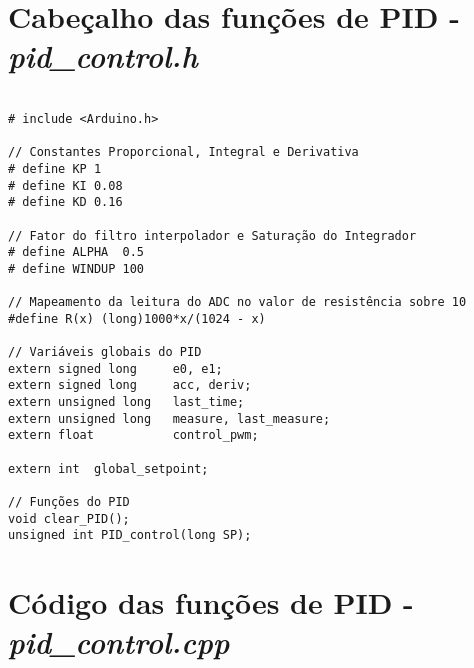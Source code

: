 \section{Cabeçalho das funções de PID - \textit{pid\_control.h}}

\begin{lstlisting}

# include <Arduino.h>

// Constantes Proporcional, Integral e Derivativa
# define KP 1
# define KI 0.08
# define KD 0.16

// Fator do filtro interpolador e Saturação do Integrador
# define ALPHA  0.5
# define WINDUP 100 

// Mapeamento da leitura do ADC no valor de resistência sobre 10
#define R(x) (long)1000*x/(1024 - x)

// Variáveis globais do PID
extern signed long     e0, e1;
extern signed long     acc, deriv;
extern unsigned long   last_time;
extern unsigned long   measure, last_measure;
extern float           control_pwm;

extern int  global_setpoint;

// Funções do PID
void clear_PID();
unsigned int PID_control(long SP);

\end{lstlisting}

\section{Código das funções de PID - \textit{pid\_control.cpp}}


